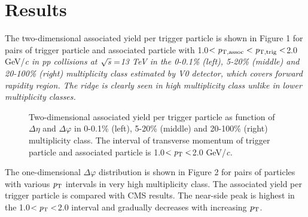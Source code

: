 
\section {Results}
\label{sec:results}

The two-dimensional associated yield per trigger particle is shown in Figure 1 for pairs of trigger particle and associated particle with 1.0$<\it{p}_{\rm{T, assoc}}<\it{p}_{\rm{T, trig}}<$2.0 GeV/\it{c}\rm{} in pp collisions at $\sqrt{\it{s}} = $\unit{13} {\rm{}TeV} in the 0-0.1\% (left), 5-20\% (middle) and 20-100\% (right) multiplicity class estimated by V0 detector, which covers forward rapidity region. The ridge is clearly seen in high multiplicity class unlike in lower multiplicity classes.


\begin{figure}
	\centering
	\caption{ Two-dimensional associated yield per trigger particle as function of $\Delta\eta$ and $\Delta\varphi$ in 0-0.1\% (left), 5-20\% (middle) and 20-100\% (right) multiplicity class. The interval of transverse momentum of trigger particle and associated particle is 1.0$<\it{p}_{\rm{T}}<$2.0 GeV/\it{c}\rm{}. }

\end{figure}

The one-dimensional $\Delta\varphi$ distribution is shown in Figure 2 for pairs of particles with various $\it{p}_{\rm{T}}$ intervals in very high multiplicity class. The associated yield per trigger particle is compared with CMS results. The near-side peak is highest in the 1.0$<\it{p}_{\rm{T}}<$2.0 interval and gradually decreases with increasing $\it{p}_{\rm{T}}$.

